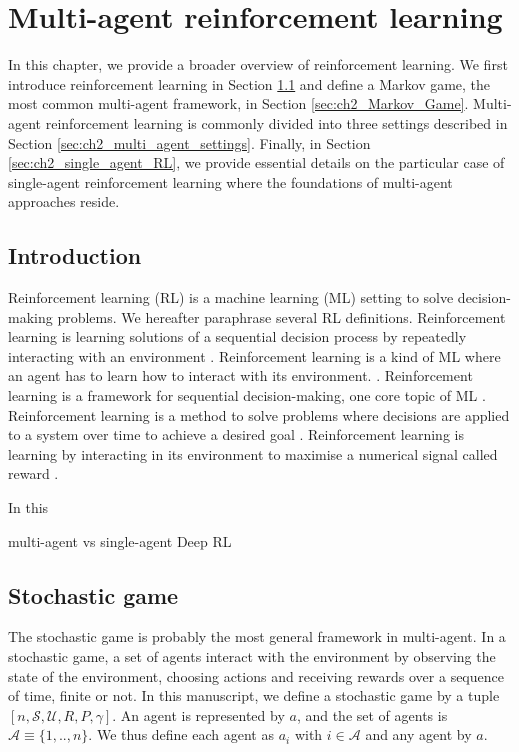 \chapter{Multi-agent reinforcement learning} \label{ch:marl}

\begin{chapter_outline}

In this chapter, we provide a broader overview of reinforcement learning.
We first introduce reinforcement learning in Section \ref{sec:ch2_Introduction} and define a Markov game, the most common multi-agent framework, in Section \ref{sec:ch2_Markov_Game}.
Multi-agent reinforcement learning is commonly divided into three settings described in Section \ref{sec:ch2_multi_agent_settings}.
Finally, in Section \ref{sec:ch2_single_agent_RL}, we provide essential details on the particular case of single-agent reinforcement learning where the foundations of multi-agent approaches reside.

\end{chapter_outline}

\section{Introduction} 
\label{sec:ch2_Introduction}
Reinforcement learning (RL) is a machine learning (ML) setting to solve decision-making problems.
We hereafter paraphrase several RL definitions.
Reinforcement learning is learning solutions of a sequential decision process by repeatedly interacting with an environment \citep{marl-book}.
Reinforcement learning is a kind of ML where an agent has to learn how to interact with its environment. \citep{pml1Book}.
Reinforcement learning is a framework for sequential decision-making, one core topic of ML \citep{introDeepRL}.
Reinforcement learning is a method to solve problems where decisions are applied to a system over time to achieve a desired goal \citep{BusoniuErnstBook}.
Reinforcement learning is learning by interacting in its environment to maximise a numerical signal called reward \citep{sutton2018reinforcement}.

In this 

multi-agent vs single-agent
Deep RL


\section{Stochastic game}
\label{sec:ch2_stochastic_Game}
The stochastic game \citep{stochasticGames} is probably the most general framework in multi-agent.
In a stochastic game, a set of agents interact with the environment by observing the state of the environment, choosing actions and receiving rewards over a sequence of time, finite or not.
In this manuscript, we define a stochastic game by a tuple $[n, \mathcal{S}, \mathcal{U}, R, P, \gamma]$.
An agent is represented by $a$, and the set of agents is $\mathcal{A} \equiv \{1,..,n\}$.
We thus define each agent as $a_i$ with $i \in \mathcal{A}$ and any agent by $a$.

